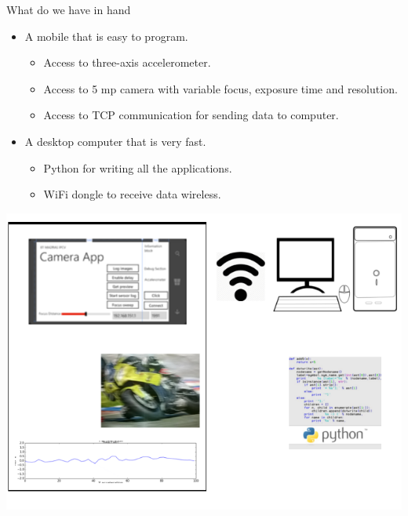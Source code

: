 \documentclass{beamer}
\begin{document}
\begin{frame}{What do we have in hand}
\begin{itemize}
	\item A mobile that is easy to program.
	\begin{itemize}
		\item Access to three-axis accelerometer.
		\item Access to 5 mp camera with variable focus, exposure time and resolution.
		\item Access to TCP communication for sending data to computer.
	\end{itemize}
	\vspace{0.4cm}
	\item A desktop computer that is very fast.
	\begin{itemize}
		\item Python for writing all the applications.
		\item WiFi dongle to receive data wireless.
	\end{itemize}
\end{itemize}
\begin{center}
	\resizebox{30mm}{!} {\includegraphics {setup.png}}
\end{center}
\end{frame}
\end{document}
